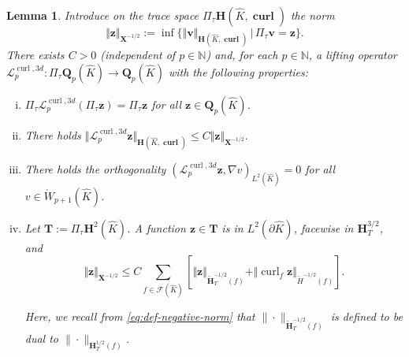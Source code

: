 \documentclass{article}
\newtheorem{lemma}[theorem]{Lemma}
\begin{document}
\begin{lemma}
\label{lemma:Hcurl-lifting} 
Introduce on the trace space $\Pi_{\tau}{\mathbf{H}}(\widehat{K}%
,\operatorname{\mathbf{curl}})$ the norm
\begin{equation}
\Vert{\mathbf{z}}\Vert_{{\mathbf{X}}^{-1/2}}:=\inf\{\Vert{\mathbf{v}}%
\Vert_{{\mathbf{H}}(\widehat{K},\operatorname{\mathbf{curl}})}\,|\,\Pi_{\tau
}{\mathbf{v}}={\mathbf{z}}\}.
\end{equation}
There exists $C >0$ (independent of $p \in {\mathbb N}$) 
and, for each $p \in {\mathbb N}$, 
a lifting operator ${\boldsymbol{\mathcal{L}}}^{\operatorname*{curl}%
,3d}_p:\Pi_\tau {\mathbf Q}_p(\widehat{K}) \rightarrow {\mathbf Q}_p(\widehat K)$
with the following properties:

\begin{enumerate}
[(i)]

\item \label{item:lemma:Hcurl-lifting-i} 
$\Pi_\tau {\boldsymbol{\mathcal{L}}}^{\operatorname*{curl},3d}_p(\Pi_\tau {\mathbf z}) = 
\Pi_\tau {\mathbf z}$ for all ${\mathbf z} \in {\mathbf Q}_p(\widehat K)$. 

\item \label{item:lemma:Hcurl-lifting-ii} There holds $\displaystyle\Vert
{\boldsymbol{\mathcal{L}}}^{\operatorname*{curl},3d}_p{\mathbf{z}}\Vert_{{\mathbf{H}%
}(\widehat{K},\operatorname{\mathbf{curl}})}\leq C\Vert{\mathbf{z}}\Vert_{{\mathbf{X}%
}^{-1/2}}.$

\item \label{item:lemma:Hcurl-lifting-iia} There holds the orthogonality $(\boldsymbol{\mathcal{L}}^{\operatorname*{curl},3d}_p\mathbf{z},\nabla v)_{L^2(\widehat{K})} = 0$ for all $v\in \mathring{W}_{p+1}(\widehat{K})$.
\item \label{item:lemma:Hcurl-lifting-iii} 
Let ${\mathbf T}:= \Pi_\tau {\mathbf H}^{2}(\widehat{K})$. 
A function ${\mathbf{z}}\in{\mathbf{T}}$ is in ${L}^2(\partial\widehat{K})$, 
facewise in ${\mathbf H}^{3/2}_{T}$, and 
$$\displaystyle\Vert{\mathbf{z}}\Vert_{{\mathbf{X}}^{-1/2}}\leq
C\sum_{f\in{\mathcal{F}}(\widehat{K})}\left[  \Vert{\mathbf{z}}\Vert
_{\widetilde{\mathbf{H}}_T^{-1/2}(f)}+\Vert\operatorname{curl}_{f}{\mathbf{z}%
}\Vert_{\widetilde{H}^{-1/2}(f)}\right]  .
$$

Here, we recall from \eqref{eq:def-negative-norm} that $\|\cdot\|_{\widetilde{\mathbf{H}}_T^{-1/2}(f)}$ 
is defined to be dual to $\|\cdot\|_{{\mathbf{H}}_T^{1/2}(f)}$.
\end{enumerate}
\end{lemma}
\end{document}
